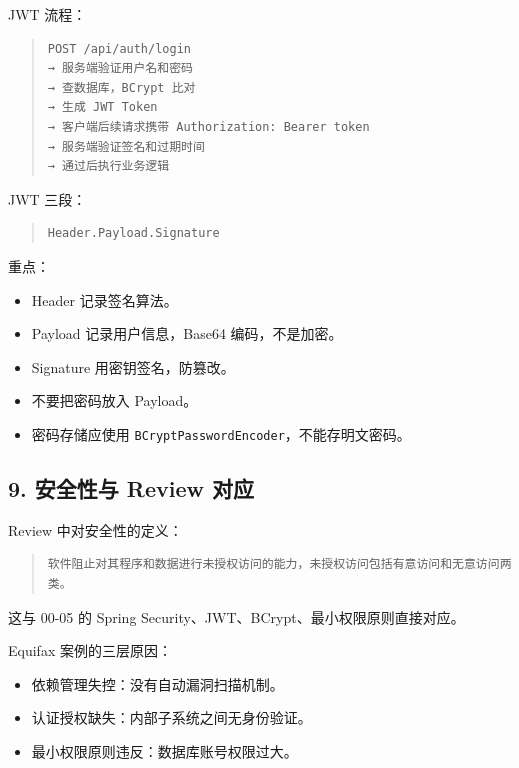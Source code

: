 \documentclass[UTF8,zihao=-4]{ctexart}
\begin{document}
JWT 流程：

\begin{quote}
\footnotesize
\begin{verbatim}
POST /api/auth/login
→ 服务端验证用户名和密码
→ 查数据库，BCrypt 比对
→ 生成 JWT Token
→ 客户端后续请求携带 Authorization: Bearer token
→ 服务端验证签名和过期时间
→ 通过后执行业务逻辑
\end{verbatim}
\end{quote}

JWT 三段：

\begin{quote}
\footnotesize
\begin{verbatim}
Header.Payload.Signature
\end{verbatim}
\end{quote}

重点：

\begin{itemize}
\item Header 记录签名算法。
\item Payload 记录用户信息，Base64 编码，不是加密。
\item Signature 用密钥签名，防篡改。
\item 不要把密码放入 Payload。
\item 密码存储应使用 \texttt{BCryptPasswordEncoder}，不能存明文密码。
\end{itemize}

\subsection{9. 安全性与 Review 对应}

Review 中对安全性的定义：

\begin{quote}
\footnotesize
\begin{verbatim}
软件阻止对其程序和数据进行未授权访问的能力，未授权访问包括有意访问和无意访问两类。
\end{verbatim}
\end{quote}

这与 00-05 的 Spring Security、JWT、BCrypt、最小权限原则直接对应。

Equifax 案例的三层原因：

\begin{itemize}
\item 依赖管理失控：没有自动漏洞扫描机制。
\item 认证授权缺失：内部子系统之间无身份验证。
\item 最小权限原则违反：数据库账号权限过大。
\end{itemize}
\end{document}
